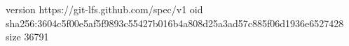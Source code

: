 version https://git-lfs.github.com/spec/v1
oid sha256:3604c5f00e5af5f9893c55427b016b4a808d25a3ad57c885f06d1936e6527428
size 36791
